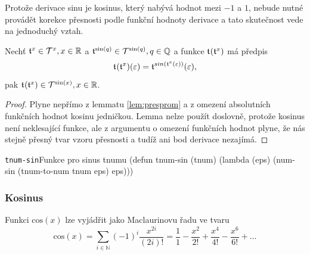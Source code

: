 Protože derivace sinu je kosinus, který nabývá hodnot mezi $-1$ a $1$, nebude nutné provádět korekce přesnosti podle funkční hodnoty derivace a tato skutečnost vede na jednoduchý vztah.

\begin{lemma}
Nechť $\mathfrak{t}^{x}\in\mathcal{T}^{x},x\in\mathbb{R}$ a $\mathfrak{t}^{\mathrm{sin}(q)}\in\mathcal{T}^{\mathrm{sin}(q)},q\in\mathbb{Q}$ a funkce $\mathfrak{t}^{}(\mathfrak{t}^{x})$ má předpis
\begin{equation}
\mathfrak{t}^{}(\mathfrak{t}^{x})(\varepsilon)=\mathfrak{t}^{sin(\mathfrak{t}^{x}(\varepsilon))}(\varepsilon),
\end{equation}
pak $\mathfrak{t}^{}(\mathfrak{t}^{x})\in\mathcal{T}^{\mathrm{sin}(x)},x\in\mathbb{R}$.
\begin{proof}
Plyne nepřímo z lemmatu \ref{lem:presprom} a z omezení absolutních funkčních hodnot kosinu jedničkou. Lemma nelze použít doslovně, protože kosinus není neklesající funkce, ale z argumentu o omezení funkčních hodnot plyne, že nás stejně přesný tvar vzoru přesnosti a tudíž ani bod derivace nezajímá.
\end{proof}
\end{lemma}

\begin{lispcode}{\texttt{tnum-sin}}{Funkce pro sinus tnumu}
(\textcolor{funkcionalni}{defun} \textcolor{pojmenovan}{tnum-sin} (tnum)
  (\textcolor{funkcionalni}{lambda} (eps)
    (\textcolor{moje}{num-sin} (\textcolor{moje}{tnum-to-num} tnum eps) eps)))
\end{lispcode}

\subsubsection{Kosinus}
\begin{fact}\label{vet:cos_jako_rada}
Funkci $\mathrm{cos}(x)$ lze vyjádřit jako Maclaurinovu řadu ve tvaru
\begin{equation}\label{rov:cos:rad}
\mathrm{cos}(x) = \sum_{i\in\mathbb{N}}(-1)^i \frac{x^{2i}}{(2i)!} = \frac{1}{1} - \frac{x^2}{2!} + \frac{x^4}{4!} - \frac{x^6}{6!} + \ldots
\end{equation}
\end{fact}

